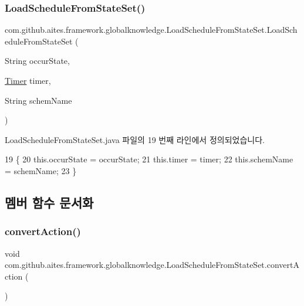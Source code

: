 \subsubsection{\texorpdfstring{Load\+Schedule\+From\+State\+Set()}{LoadScheduleFromStateSet()}}
{\footnotesize\ttfamily com.\+github.\+aites.\+framework.\+globalknowledge.\+Load\+Schedule\+From\+State\+Set.\+Load\+Schedule\+From\+State\+Set (\begin{DoxyParamCaption}\item[{String}]{occur\+State,  }\item[{\mbox{\hyperlink{classcom_1_1github_1_1aites_1_1framework_1_1framework_1_1_timer}{Timer}}}]{timer,  }\item[{String}]{schem\+Name }\end{DoxyParamCaption})}



Load\+Schedule\+From\+State\+Set.\+java 파일의 19 번째 라인에서 정의되었습니다.


\begin{DoxyCode}
19                                                                                      \{
20         this.occurState = occurState;
21         this.timer = timer;
22         this.schemName = schemName;
23     \}
\end{DoxyCode}


\subsection{멤버 함수 문서화}
\mbox{\label{classcom_1_1github_1_1aites_1_1framework_1_1globalknowledge_1_1_load_schedule_from_state_set_ad91903aa1620cad091ef94cdb1c05ae3}} 
\subsubsection{\texorpdfstring{convert\+Action()}{convertAction()}}
{\footnotesize\ttfamily void com.\+github.\+aites.\+framework.\+globalknowledge.\+Load\+Schedule\+From\+State\+Set.\+convert\+Action (\begin{DoxyParamCaption}{ }\end{DoxyParamCaption})\hspace{0.3cm}{\ttfamily [private]}}



